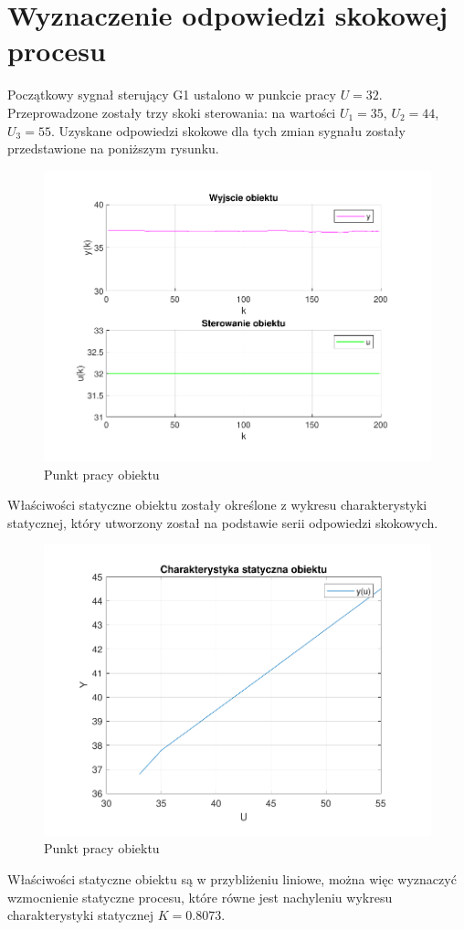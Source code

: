 \section{Wyznaczenie odpowiedzi skokowej procesu}

Początkowy sygnał sterujący G1 ustalono w punkcie pracy $U=32$. 
Przeprowadzone zostały trzy skoki sterowania: na wartości $U_{1}=35$, $U_{2}=44$, $U_{3}=55$. 
Uzyskane odpowiedzi skokowe dla tych zmian sygnału zostały przedstawione na poniższym rysunku.

\begin{figure}[H]
    \centering
    \includegraphics[scale=0.90]{../lab/zad_1/y.pdf}
    \caption{Punkt pracy obiektu}
\end{figure}


Właściwości statyczne obiektu zostały określone z wykresu charakterystyki statycznej, 
który utworzony został na podstawie serii odpowiedzi skokowych. 

\begin{figure}[H]
    \centering
    \includegraphics[scale=0.90]{../lab/zad_2/char_stat.pdf}
    \caption{Punkt pracy obiektu}
\end{figure}

Właściwości statyczne obiektu są w przybliżeniu liniowe, 
można więc wyznaczyć wzmocnienie statyczne procesu, 
które równe jest nachyleniu wykresu charakterystyki statycznej $K=\num{0.8073}$.
